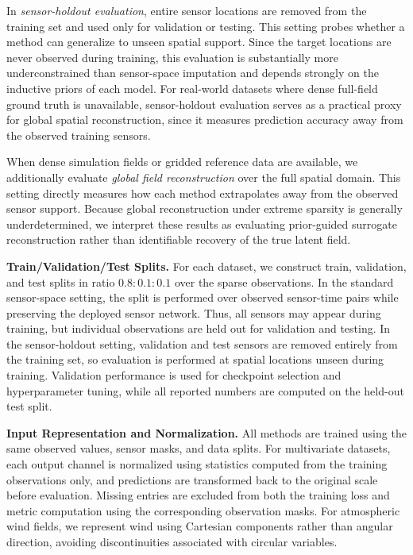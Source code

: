 In \emph{sensor-holdout evaluation}, entire sensor locations are removed from the training set and used only for validation or testing. This setting probes whether a method can generalize to unseen spatial support. Since the target locations are never observed during training, this evaluation is substantially more underconstrained than sensor-space imputation and depends strongly on the inductive priors of each model. For real-world datasets where dense full-field ground truth is unavailable, sensor-holdout evaluation serves as a practical proxy for global spatial reconstruction, since it measures prediction accuracy away from the observed training sensors.

When dense simulation fields or gridded reference data are available, we additionally evaluate \emph{global field reconstruction} over the full spatial domain. This setting directly measures how each method extrapolates away from the observed sensor support. Because global reconstruction under extreme sparsity is generally underdetermined, we interpret these results as evaluating prior-guided surrogate reconstruction rather than identifiable recovery of the true latent field.

\noindent\textbf{Train/Validation/Test Splits.}
For each dataset, we construct train, validation, and test splits in ratio $0.8:0.1:0.1$ over the sparse observations. In the standard sensor-space setting, the split is performed over observed sensor-time pairs while preserving the deployed sensor network. Thus, all sensors may appear during training, but individual observations are held out for validation and testing. In the sensor-holdout setting, validation and test sensors are removed entirely from the training set, so evaluation is performed at spatial locations unseen during training. Validation performance is used for checkpoint selection and hyperparameter tuning, while all reported numbers are computed on the held-out test split.

\noindent\textbf{Input Representation and Normalization.}
All methods are trained using the same observed values, sensor masks, and data splits. For multivariate datasets, each output channel is normalized using statistics computed from the training observations only, and predictions are transformed back to the original scale before evaluation. Missing entries are excluded from both the training loss and metric computation using the corresponding observation masks. For atmospheric wind fields, we represent wind using Cartesian components rather than angular direction, avoiding discontinuities associated with circular variables.

